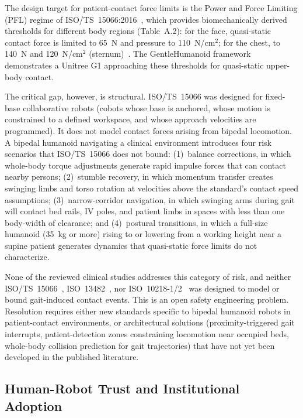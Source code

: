 The design target for patient-contact force limits is the Power and Force
Limiting (PFL) regime of ISO/TS~15066:2016~\cite{isots15066}, which provides
biomechanically derived thresholds for different body regions
(Table~A.2): for the face, quasi-static contact force is limited to 65~N and
pressure to 110~N/cm$^2$; for the chest, to 140~N and 120~N/cm$^2$
(sternum)~\cite{isots15066}. The GentleHumanoid framework demonstrates a
Unitree G1 approaching these thresholds for quasi-static upper-body contact.

The critical gap, however, is structural. ISO/TS~15066 was designed for
fixed-base collaborative robots (cobots whose base is anchored, whose motion is
constrained to a defined workspace, and whose approach velocities are programmed).
It does not model contact forces arising from bipedal locomotion. A bipedal
humanoid navigating a clinical environment introduces four risk scenarios that
ISO/TS~15066 does not bound: (1)~balance corrections, in which whole-body torque
adjustments generate rapid impulse forces that can contact nearby persons;
(2)~stumble recovery, in which momentum transfer creates swinging limbs and torso
rotation at velocities above the standard's contact speed assumptions;
(3)~narrow-corridor navigation, in which swinging arms during gait will contact
bed rails, IV poles, and patient limbs in spaces with less than one body-width of
clearance; and (4)~postural transitions, in which a full-size humanoid (35~kg or
more) rising to or lowering from a working height near a supine patient generates
dynamics that quasi-static force limits do not characterize.

None of the reviewed clinical studies addresses this category of risk, and neither
ISO/TS~15066~\cite{isots15066}, ISO~13482~\cite{iso13482}, nor
ISO~10218-1/2~\cite{iso10218_1,iso10218_2} was designed to model or bound
gait-induced contact events. This is an open safety engineering problem.
Resolution requires either new standards specific to bipedal humanoid robots in
patient-contact environments, or architectural solutions (proximity-triggered
gait interrupts, patient-detection zones constraining locomotion near occupied
beds, whole-body collision prediction for gait trajectories) that have not yet
been developed in the published literature.

\subsection{Human-Robot Trust and Institutional Adoption}
\label{sec:trust}

